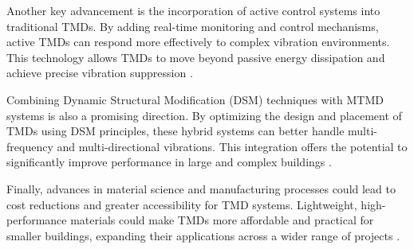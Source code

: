 \documentclass[twocolumn]{article}
\begin{document}
Another key advancement is the incorporation of active control systems into traditional TMDs. By adding real-time monitoring and control mechanisms, active TMDs can respond more effectively to complex vibration environments. This technology allows TMDs to move beyond passive energy dissipation and achieve precise vibration suppression \cite{elias_research_2017}.

Combining Dynamic Structural Modification (DSM) techniques with MTMD systems is also a promising direction. By optimizing the design and placement of TMDs using DSM principles, these hybrid systems can better handle multi-frequency and multi-directional vibrations. This integration offers the potential to significantly improve performance in large and complex buildings \cite{gutierrez_soto_tuned_2013}.

Finally, advances in material science and manufacturing processes could lead to cost reductions and greater accessibility for TMD systems. Lightweight, high-performance materials could make TMDs more affordable and practical for smaller buildings, expanding their applications across a wider range of projects \cite{richiedei_beyond_2022}\cite{gutierrez_soto_tuned_2013}.


\iffalse

\section*{Acknowledage}
We would like to express our sincere gratitude to the National Cancer Institute Cancer Imaging Program for generously making their high-quality medical imaging dataset available and authorized for use on the Internet, providing indispensable resources for the smooth conduct of this research.
\fi



\end{document}
